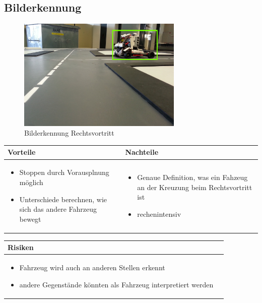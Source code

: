 \pagebreak


\subsection{Bilderkennung}

\begin{figure}[h!]%
\centering
\includegraphics[width=0.7\textwidth]{fig/rechtsvortritt_bilderkennung.png}
\caption{Bilderkennung Rechtsvortritt}
\label{fig:Bilderkennung Rechtsvortritt}
\end{figure}

\begin{table}[h]
\begin{tabular}{p{} | p{}}


 \textbf{Vorteile} & \textbf{Nachteile} \\ \hline
	 
\begin{itemize}
\item Stoppen durch Vorausplnung möglich
\item Unterschiede berechnen, wie sich das andere Fahrzeug bewegt
\end{itemize}

 
 &
 
\begin{itemize}
\item Genaue Definition, was ein Fahzeug an der Kreuzung beim Rechtsvortritt ist
\item rechenintensiv
\end{itemize}

\end{tabular}
\end{table}

\begin{table}[h]
\begin{tabular}{p{}p{}}


\textbf{Risiken} & \\ \hline
	 
\begin{itemize}
\item Fahrzeug wird auch an anderen Stellen erkennt
\item andere Gegenstände könnten als Fahrzeug interpretiert werden

\end{itemize}

 
\end{tabular}
\end{table}

\pagebreak